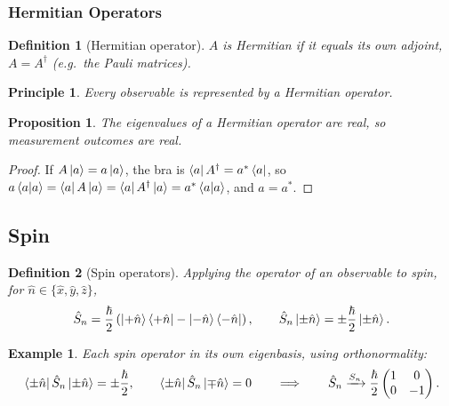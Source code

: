 \documentclass{article}
\newtheorem{principle}{Principle}
\newtheorem{definition}{Definition}
\newtheorem*{example}{Example}
\newtheorem{proposition}{Proposition}
\begin{document}
\subsubsection{Hermitian Operators}
\begin{definition}[Hermitian operator]
    \label{def:hermitian}
    $A$ is Hermitian if it equals its own adjoint, $A = A^\dagger$ (e.g.\ the Pauli matrices).
\end{definition}
\begin{principle}
    \label{prin:hermitian}
    Every observable is represented by a Hermitian operator.
\end{principle}
\begin{proposition}
    The eigenvalues of a Hermitian operator are real, so measurement outcomes are real.
\end{proposition}
\begin{proof}
    If $A\ket{a} = a\ket{a}$, the bra is $\bra{a}A^\dagger = a^*\bra{a}$, so $a\braket{a|a} = \bra{a}A\ket{a} = \bra{a}A^\dagger\ket{a} = a^*\braket{a|a}$, and $a = a^*$.
\end{proof}

\subsection{Spin}
\begin{definition}[Spin operators]
    Applying the operator of an observable to spin, for $\hat{n} \in \{\hat{x},\hat{y},\hat{z}\}$,
    \begin{equation}
        \hat{S}_n = \frac{\hbar}{2}\left(\ket{+\hat{n}}\bra{+\hat{n}} - \ket{-\hat{n}}\bra{-\hat{n}}\right), \qquad \hat{S}_n\ket{\pm\hat{n}} = \pm\frac{\hbar}{2}\ket{\pm\hat{n}}.
    \end{equation}
\end{definition}
\begin{example}
    Each spin operator in its own eigenbasis, using orthonormality:
    \[\bra{\pm\hat{n}}\hat{S}_n\ket{\pm\hat{n}} = \pm\frac{\hbar}{2}, \qquad \bra{\pm\hat{n}}\hat{S}_n\ket{\mp\hat{n}} = 0 \qquad\Longrightarrow\qquad \hat{S}_n \xrightarrow{S_n} \frac{\hbar}{2}\begin{pmatrix} 1 & 0 \\ 0 & -1 \end{pmatrix}.\]
\end{example}
\end{document}
